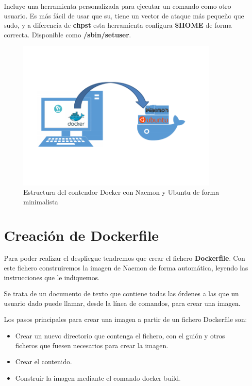Incluye una herramienta personalizada para ejecutar un comando como otro usuario. Es más fácil de usar que su, tiene un vector de ataque más pequeño que sudo, y a diferencia de \textbf{chpst} esta herramienta configura \textbf{\$HOME} de forma correcta. Disponible como \textbf{/sbin/setuser}.
\begin{figure}[H]
	\centering
	\includegraphics[width=0.9\textwidth]{imagenes/despliegue_naemon/docker_naemon.png}
	\caption{Estructura del contendor Docker con Naemon y Ubuntu de forma minimalista} \label{dockernaemon}
\end{figure}
\newpage
\section{Creación de Dockerfile}

Para poder realizar el despliegue tendremos que crear el fichero \textbf{Dockerfile}. Con este fichero construiremos la imagen de Naemon de forma automática, leyendo las instrucciones que le indiquemos.

Se trata de un documento de texto que contiene todas las órdenes a las que un usuario dado puede llamar, desde la línea de comandos, para crear una imagen.

Los pasos principales para crear una imagen a partir de un fichero Dockerfile son:

\begin{itemize}
	\item Crear un nuevo directorio que contenga el fichero, con el guión y otros ficheros que fuesen necesarios para crear la imagen.
	\item Crear el contenido.
	\item Construir la imagen mediante el comando docker build.
\end{itemize}

